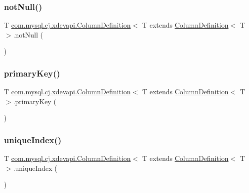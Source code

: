 \subsubsection{\texorpdfstring{not\+Null()}{notNull()}}
{\footnotesize\ttfamily T \mbox{\hyperlink{interfacecom_1_1mysql_1_1cj_1_1protocol_1_1_column_definition}{com.\+mysql.\+cj.\+xdevapi.\+Column\+Definition}}$<$ T extends \mbox{\hyperlink{interfacecom_1_1mysql_1_1cj_1_1protocol_1_1_column_definition}{Column\+Definition}}$<$ T $>$.not\+Null (\begin{DoxyParamCaption}{ }\end{DoxyParamCaption})}

\mbox{\label{interfacecom_1_1mysql_1_1cj_1_1xdevapi_1_1_column_definition_ab7fc68e92f18f5fcb15f652f2587eab2}} 
\subsubsection{\texorpdfstring{primary\+Key()}{primaryKey()}}
{\footnotesize\ttfamily T \mbox{\hyperlink{interfacecom_1_1mysql_1_1cj_1_1protocol_1_1_column_definition}{com.\+mysql.\+cj.\+xdevapi.\+Column\+Definition}}$<$ T extends \mbox{\hyperlink{interfacecom_1_1mysql_1_1cj_1_1protocol_1_1_column_definition}{Column\+Definition}}$<$ T $>$.primary\+Key (\begin{DoxyParamCaption}{ }\end{DoxyParamCaption})}

\mbox{\label{interfacecom_1_1mysql_1_1cj_1_1xdevapi_1_1_column_definition_afa9fbc02160fd06cb9f028d1c347b253}} 
\subsubsection{\texorpdfstring{unique\+Index()}{uniqueIndex()}}
{\footnotesize\ttfamily T \mbox{\hyperlink{interfacecom_1_1mysql_1_1cj_1_1protocol_1_1_column_definition}{com.\+mysql.\+cj.\+xdevapi.\+Column\+Definition}}$<$ T extends \mbox{\hyperlink{interfacecom_1_1mysql_1_1cj_1_1protocol_1_1_column_definition}{Column\+Definition}}$<$ T $>$.unique\+Index (\begin{DoxyParamCaption}{ }\end{DoxyParamCaption})}

